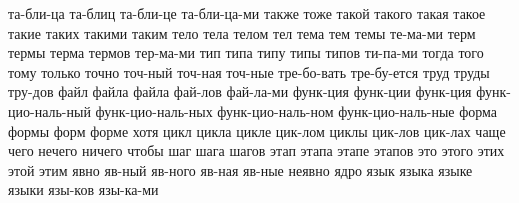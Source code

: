 {%
  та-бли-ца та-блиц та-бли-це та-бли-ца-ми
  также тоже
  такой такого такая такое такие таких такими таким
  тело тела телом тел
  тема тем темы те-ма-ми
  терм термы терма термов тер-ма-ми
  тип типа типу типы типов ти-па-ми
  тогда
  того тому
  только
  точно точ-ный точ-ная точ-ные
  тре-бо-вать тре-бу-ется
  труд труды тру-дов
  файл файла файла фай-лов фай-ла-ми
  функ-ция функ-ции функ-ция
  функ-цио-наль-ный функ-цио-наль-ных функ-цио-наль-ном функ-цио-наль-ные
  форма формы форм форме
  хотя
  цикл цикла цикле цик-лом циклы цик-лов цик-лах  
  чаще
  чего нечего ничего
  чтобы
  шаг шага шагов
  этап этапа этапе этапов
  это этого этих этой этим
  явно яв-ный яв-ного яв-ная яв-ные неявно
  ядро
  язык языка языке языки язы-ков язы-ка-ми
}
